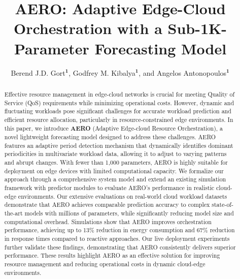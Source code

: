 \documentclass{ieeetmlcn}
\def\authorrefmark#1{\ensuremath{^{\textbf{#1}}}}
\begin{document}


\title{AERO: Adaptive Edge-Cloud Orchestration with a Sub-1K-Parameter Forecasting Model}

\author{Berend J.D. Gort\authorrefmark{1}, Godfrey M. Kibalya\authorrefmark{1}, and Angelos Antonopoulos\authorrefmark{1}}
\affil{\authorrefmark{1}Nearby Computing, Barcelona, Spain}


\begin{abstract}
Effective resource management in edge-cloud networks is crucial for meeting Quality of Service (QoS) requirements while minimizing operational costs. However, dynamic and fluctuating workloads pose significant challenges for accurate workload prediction and efficient resource allocation, particularly in resource-constrained edge environments. In this paper, we introduce \textbf{AERO} (Adaptive Edge-cloud Resource Orchestration), a novel lightweight forecasting model designed to address these challenges. AERO features an adaptive period detection mechanism that dynamically identifies dominant periodicities in multivariate workload data, allowing it to adjust to varying patterns and abrupt changes. With fewer than 1,000 parameters, AERO is highly suitable for deployment on edge devices with limited computational capacity. We formalize our approach through a comprehensive system model and extend an existing simulation framework with predictor modules to evaluate AERO's performance in realistic cloud-edge environments. Our extensive evaluations on real-world cloud workload datasets demonstrate that AERO achieves comparable prediction accuracy to complex state-of-the-art models with millions of parameters, while significantly reducing model size and computational overhead. Simulations show that AERO improves orchestration performance, achieving up to 13\% reduction in energy consumption and 67\% reduction in response times compared to reactive approaches. {\color{blue} Our live deployment experiments further validate these findings, demonstrating that AERO consistently delivers superior performance}. These results highlight AERO as an effective solution for improving resource management and reducing operational costs in dynamic cloud-edge environments.
\end{abstract}
\end{document}
